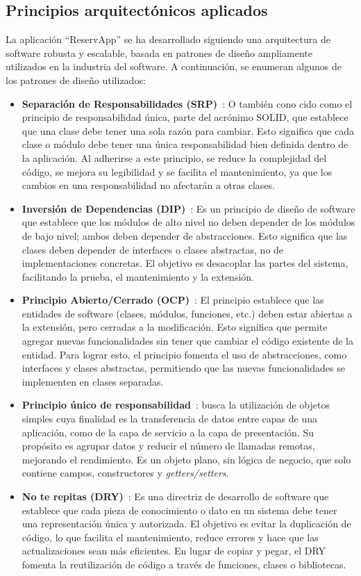 \subsection{Principios arquitectónicos aplicados}
La aplicación ``ReservApp'' se ha desarrollado siguiendo una arquitectura de software robusta y escalable, basada en patrones de diseño ampliamente utilizados en la industria del software. A continuación, se enumeran algunos de los patrones de diseño utilizados:

\begin{itemize}
    \item \textbf{Separación de Responsabilidades (SRP)}~\cite{principio-srp}: O también cono cido como el principio de responsabilidad única, parte del acrónimo SOLID, que establece que una clase debe tener una sola razón para cambiar. Esto significa que cada clase o módulo debe tener una única responsabilidad bien definida dentro de la aplicación. Al adherirse a este principio, se reduce la complejidad del código, se mejora su legibilidad y se facilita el mantenimiento, ya que los cambios en una responsabilidad no afectarán a otras clases.
    \item \textbf{Inversión de Dependencias (DIP)}~\cite{patron-repository}: Es un principio de diseño de software que establece que los módulos de alto nivel no deben depender de los módulos de bajo nivel; ambos deben depender de abstracciones. Esto significa que las clases deben depender de interfaces o clases abstractas, no de implementaciones concretas. El objetivo es desacoplar las partes del sistema, facilitando la prueba, el mantenimiento y la extensión.
    \item \textbf{Principio Abierto/Cerrado (OCP)}~\cite{principio-ocp}: El principio establece que las entidades de software (clases, módulos, funciones, etc.) deben estar abiertas a la extensión, pero cerradas a la modificación. Esto significa que permite agregar nuevas funcionalidades sin tener que cambiar el código existente de la entidad. Para lograr esto, el principio fomenta el uso de abstracciones, como interfaces y clases abstractas, permitiendo que las nuevas funcionalidades se implementen en clases separadas.

    \item \textbf{Principio único de responsabilidad}~\cite{patron-dto}: busca la utilización de objetos simples cuya finalidad es la transferencia de datos entre capas de una aplicación, como de la capa de servicio a la capa de presentación. Su propósito es agrupar datos y reducir el número de llamadas remotas, mejorando el rendimiento. Es un objeto plano, sin lógica de negocio, que solo contiene campos, constructores y \emph{getters/setters}.
    \item \textbf{No te repitas (DRY)}~\cite{principio-dry}: Es una directriz de desarrollo de software que establece que cada pieza de conocimiento o dato en un sistema debe tener una representación única y autorizada. El objetivo es evitar la duplicación de código, lo que facilita el mantenimiento, reduce errores y hace que las actualizaciones sean más eficientes. En lugar de copiar y pegar, el DRY fomenta la reutilización de código a través de funciones, clases o bibliotecas.
\end{itemize}

